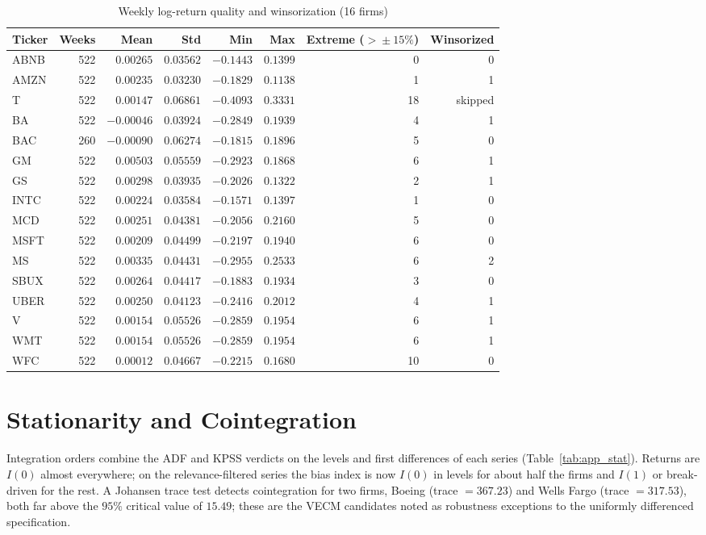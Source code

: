 \documentclass[conference]{IEEEtran}
\begin{document}
\begin{table}[!t]
\caption{Weekly log-return quality and winsorization (16 firms)}
\label{tab:app_returns}
\centering
\small
\begin{tabular}{lrrrrrrr}
\toprule
Ticker & Weeks & Mean & Std & Min & Max & Extreme ($>\!\pm15\%$) & Winsorized \\
\midrule
ABNB & 522 & $0.00265$  & $0.03562$ & $-0.1443$ & $0.1399$ & 0  & 0 \\
AMZN & 522 & $0.00235$  & $0.03230$ & $-0.1829$ & $0.1138$ & 1  & 1 \\
T    & 522 & $0.00147$  & $0.06861$ & $-0.4093$ & $0.3331$ & 18 & skipped \\
BA   & 522 & $-0.00046$ & $0.03924$ & $-0.2849$ & $0.1939$ & 4  & 1 \\
BAC  & 260 & $-0.00090$ & $0.06274$ & $-0.1815$ & $0.1896$ & 5  & 0 \\
GM   & 522 & $0.00503$  & $0.05559$ & $-0.2923$ & $0.1868$ & 6  & 1 \\
GS   & 522 & $0.00298$  & $0.03935$ & $-0.2026$ & $0.1322$ & 2  & 1 \\
INTC & 522 & $0.00224$  & $0.03584$ & $-0.1571$ & $0.1397$ & 1  & 0 \\
MCD  & 522 & $0.00251$  & $0.04381$ & $-0.2056$ & $0.2160$ & 5  & 0 \\
MSFT & 522 & $0.00209$  & $0.04499$ & $-0.2197$ & $0.1940$ & 6  & 0 \\
MS   & 522 & $0.00335$  & $0.04431$ & $-0.2955$ & $0.2533$ & 6  & 2 \\
SBUX & 522 & $0.00264$  & $0.04417$ & $-0.1883$ & $0.1934$ & 3  & 0 \\
UBER & 522 & $0.00250$  & $0.04123$ & $-0.2416$ & $0.2012$ & 4  & 1 \\
V    & 522 & $0.00154$  & $0.05526$ & $-0.2859$ & $0.1954$ & 6  & 1 \\
WMT  & 522 & $0.00154$  & $0.05526$ & $-0.2859$ & $0.1954$ & 6  & 1 \\
WFC  & 522 & $0.00012$  & $0.04667$ & $-0.2215$ & $0.1680$ & 10 & 0 \\
\bottomrule
\end{tabular}
\end{table}

\section{Stationarity and Cointegration}
\label{app:stationarity}
Integration orders combine the ADF and KPSS verdicts on the levels and first
differences of each series (Table~\ref{tab:app_stat}). Returns are $I(0)$ almost
everywhere; on the relevance-filtered series the bias index is now $I(0)$ in
levels for about half the firms and $I(1)$ or break-driven for the rest. A
Johansen trace test detects cointegration for two firms, Boeing
(trace $=367.23$) and Wells Fargo (trace $=317.53$), both far above the $95\%$
critical value of $15.49$; these are the VECM candidates noted as robustness
exceptions to the uniformly differenced specification.
\end{document}
